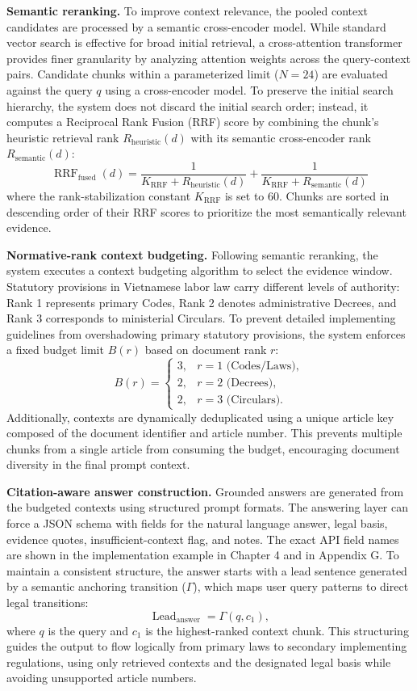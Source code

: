 \textbf{Semantic reranking.} To improve context relevance, the pooled context candidates are processed by a semantic cross-encoder model. While standard vector search is effective for broad initial retrieval, a cross-attention transformer provides finer granularity by analyzing attention weights across the query-context pairs. Candidate chunks within a parameterized limit ($N = 24$) are evaluated against the query $q$ using a cross-encoder model. To preserve the initial search hierarchy, the system does not discard the initial search order; instead, it computes a Reciprocal Rank Fusion (RRF) score by combining the chunk's heuristic retrieval rank $R_{\mathrm{heuristic}}(d)$ with its semantic cross-encoder rank $R_{\mathrm{semantic}}(d)$:
\[
\operatorname{RRF}_{\mathrm{fused}}(d) = \frac{1}{K_{\mathrm{RRF}} + R_{\mathrm{heuristic}}(d)} + \frac{1}{K_{\mathrm{RRF}} + R_{\mathrm{semantic}}(d)}
\]
where the rank-stabilization constant $K_{\mathrm{RRF}}$ is set to $60$. Chunks are sorted in descending order of their RRF scores to prioritize the most semantically relevant evidence.

\textbf{Normative-rank context budgeting.} Following semantic reranking, the system executes a context budgeting algorithm to select the evidence window. Statutory provisions in Vietnamese labor law carry different levels of authority: Rank 1 represents primary Codes, Rank 2 denotes administrative Decrees, and Rank 3 corresponds to ministerial Circulars. To prevent detailed implementing guidelines from overshadowing primary statutory provisions, the system enforces a fixed budget limit $B(r)$ based on document rank $r$:
\[
B(r)=
\begin{cases}
3, & r = 1 \text{ (Codes/Laws)},\\
2, & r = 2 \text{ (Decrees)},\\
2, & r = 3 \text{ (Circulars)}.
\end{cases}
\]
Additionally, contexts are dynamically deduplicated using a unique article key composed of the document identifier and article number. This prevents multiple chunks from a single article from consuming the budget, encouraging document diversity in the final prompt context.

\textbf{Citation-aware answer construction.} Grounded answers are generated from the budgeted contexts using structured prompt formats. The answering layer can force a JSON schema with fields for the natural language answer, legal basis, evidence quotes, insufficient-context flag, and notes. The exact API field names are shown in the implementation example in Chapter 4 and in Appendix G. To maintain a consistent structure, the answer starts with a lead sentence generated by a semantic anchoring transition ($\Gamma$), which maps user query patterns to direct legal transitions:
\[
\operatorname{Lead}_{\mathrm{answer}} = \Gamma(q, c_1),
\]
where $q$ is the query and $c_1$ is the highest-ranked context chunk. This structuring guides the output to flow logically from primary laws to secondary implementing regulations, using only retrieved contexts and the designated legal basis while avoiding unsupported article numbers.

